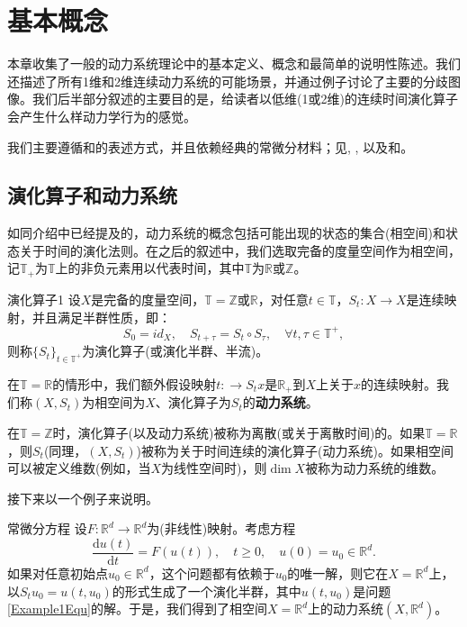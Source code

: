 \chapter{基本概念}

本章收集了一般的动力系统理论中的基本定义、概念和最简单的说明性陈述。我们还描述了所有1维和2维连续动力系统的可能场景，并通过例子讨论了主要的分歧图像。我们后半部分叙述的主要目的是，给读者以低维(1或2维)的连续时间演化算子会产生什么样动力学行为的感觉。

我们主要遵循\cite{Nemytskii60}和\cite{Sibirsky75}的表述方式，并且依赖经典的常微分材料；见\cite{Coddington55}, \cite{Hartman02}, \cite{Lefschetz77}以及\cite{Bautin90}和\cite{Reissing74}。

\section{演化算子和动力系统}
如同介绍中已经提及的，动力系统的概念包括可能出现的状态的集合(相空间)和状态关于时间的演化法则。在之后的叙述中，我们选取完备的度量空间作为相空间，记$\mathbb{T}_{+}$为$\mathbb{T}$上的非负元素用以代表时间，其中$\mathbb{T}$为$\mathbb{R}$或$\mathbb{Z}$。

\begin{defination}{演化算子}{1}
	设$X$是完备的度量空间，$\mathbb{T}=\mathbb{Z}$或$\mathbb{R}$，对任意$t\in\mathbb{T}$，$S_{t}:X\to X$是连续映射，并且满足半群性质，即：$$S_{0}=id_{X},\quad S_{t+\tau}=S_{t}\circ S_{\tau},\quad\forall t,\tau\in\mathbb{T}^{+},$$则称$\{S_{t}\}_{t\in \mathbb{T}^{+}}$为演化算子(或演化半群、半流)。
\end{defination}

在$\mathbb{T}=\mathbb{R}$的情形中，我们额外假设映射$t:\to S_{t}x$是$\mathbb{R}_{+}$到$X$上关于$x$的连续映射。我们称$(X,S_{t})$为相空间为$X$、演化算子为$S_{t}$的\textbf{动力系统}。

在$\mathbb{T}=\mathbb{Z}$时，演化算子(以及动力系统)被称为离散(或关于离散时间)的。如果$\mathbb{T}=\mathbb{R}$，则$S_{t}$(同理，$(X,S_{t})$)被称为关于时间连续的演化算子(动力系统)。如果相空间可以被定义维数(例如，当$X$为线性空间时)，则$\dim X$被称为动力系统的维数。

接下来以一个例子来说明。

\begin{example}{常微分方程}
	设$F:\mathbb{R}^{d}\to\mathbb{R}^{d}$为(非线性)映射。考虑方程
	\begin{equation}\label{Example1Equ}
		\frac{\mathrm{d}u(t)}{\mathrm{d}t}=F(u(t)),\quad t\geqslant 0,\quad u(0)=u_{0}\in\mathbb{R}^{d}.
	\end{equation}
	如果对任意初始点$u_{0}\in\mathbb{R}^{d}$，这个问题都有依赖于$u_{0}$的唯一解，则它在$X=\mathbb{R}^{d}$上，以$S_{t}u_{0}=u(t,u_{0})$的形式生成了一个演化半群，其中$u(t,u_{0})$是问题\ref{Example1Equ}的解。于是，我们得到了相空间$X=\mathbb{R}^{d}$上的动力系统$(X,\mathbb{R}^{d})$。
\end{example}

